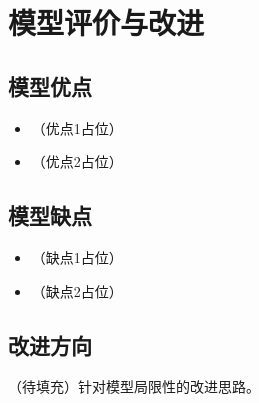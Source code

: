 
\section{模型评价与改进}\label{sec:evaluation}

\subsection{模型优点}\label{sec:pros}
\begin{itemize}
    \item （优点1占位）
    \item （优点2占位）
\end{itemize}

\subsection{模型缺点}\label{sec:cons}
\begin{itemize}
    \item （缺点1占位）
    \item （缺点2占位）
\end{itemize}

\subsection{改进方向}\label{sec:improvement}
\noindent （待填充）针对模型局限性的改进思路。
